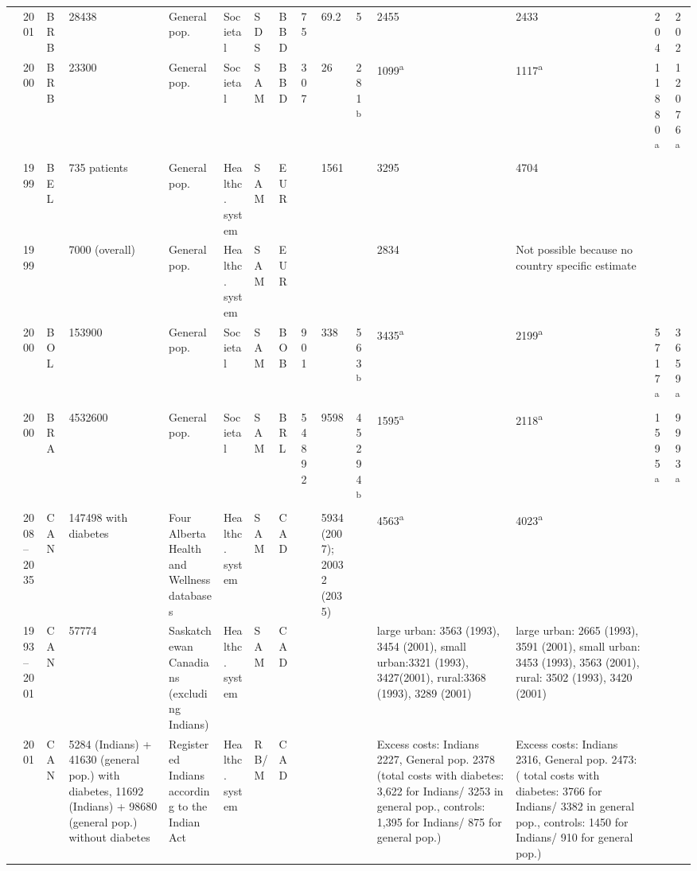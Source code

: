 \documentclass[12pt,english]{article}
\begin{document}
\begin{appendix}
\begin{landscape}
\begin{tabularx}{\linewidth}{Z X X Z Z X X X X X X X X Y Y}
\textcite{Abdulkadri2009b} & 2001 & BRB & 28438 & General pop. & Societal & SDS & BBD & 75 & 69.2 & 5 & 2455 & 2433 & 204 & 202 \\
\textcite{Barcelo2003} & 2000 & BRB & 23300 & General pop. & Societal & SAM & BBD & 307 & 26 & 281\textsuperscript{b} & 1099\textsuperscript{a} & 1117\textsuperscript{a} & 11880\textsuperscript{a} & 12076\textsuperscript{a} \\
\textcite{Jonsson2002b} & 1999 & BEL & 735 patients & General pop. & Healthc. system & SAM & EUR &  & 1561 &  & 3295 & 4704 &  &  \\
\textcite{Jonsson2002b} & 1999 &  & 7000 (overall) & General pop. & Healthc. system & SAM & EUR &  &  &  & 2834 &Not possible because no country specific   estimate &  &  \\
\textcite{Barcelo2003} & 2000 & BOL & 153900 & General pop. & Societal & SAM & BOB & 901 & 338 & 563\textsuperscript{b} & 3435\textsuperscript{a} & 2199\textsuperscript{a} & 5717\textsuperscript{a} & 3659\textsuperscript{a} \\
\textcite{Barcelo2003} & 2000 & BRA & 4532600 & General pop. & Societal & SAM & BRL & 54892 & 9598 & 45294\textsuperscript{b} & 1595\textsuperscript{a} & 2118\textsuperscript{a} & 1595\textsuperscript{a} & 9993\textsuperscript{a} \\
\textcite{Lau2011a} & 2008--2035 & CAN & 147498 with diabetes & Four Alberta Health and Wellness databases & Healthc. system & SAM & CAD &  & 5934 (2007); 20032 (2035) &  & 4563\textsuperscript{a} & 4023\textsuperscript{a} &  &  \\
\textcite{Pohar2007} & 1993--2001 & CAN & 57774 & Saskatchewan Canadians (excluding Indians) & Healthc. system & SAM & CAD &  &  &  & large urban: 3563 (1993), 3454 (2001), small  urban:3321 (1993), 3427(2001), rural:3368 (1993), 3289 (2001) & large urban: 2665 (1993), 3591 (2001),   small urban: 3453 (1993), 3563 (2001), rural: 3502 (1993), 3420 (2001) &  &  \\
\textcite{Pohar2007a} & 2001 & CAN & 5284 (Indians) + 41630 (general pop.) with  diabetes, 11692 (Indians) + 98680 (general pop.) without diabetes & Registered Indians according to the Indian   Act & Healthc. system & RB/M & CAD &  &  &  & Excess costs: Indians 2227, General pop.   2378 (total costs with diabetes: 3,622 for Indians/ 3253 in general pop.,   controls: 1,395 for Indians/ 875 for general pop.) & Excess costs: Indians 2316, General pop.   2473: ( total costs with diabetes: 3766 for Indians/ 3382 in general pop.,   controls: 1450 for Indians/ 910 for general pop.) &  &  \\

\end{tabularx}
\end{landscape}
\end{appendix}
\end{document}
